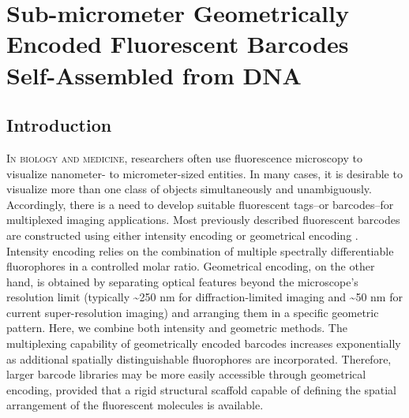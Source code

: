 
\chapter{Sub-micrometer Geometrically Encoded Fluorescent Barcodes Self-Assembled from DNA}\label{chapter:DNAbarcode}

\section{Introduction}
\lettrine{I}{n biology and medicine}, researchers often use fluorescence microscopy to visualize nanometer- to micrometer-sized entities. In many cases, it is desirable to visualize more than one class of objects simultaneously and unambiguously. Accordingly, there is a need to develop suitable 
fluorescent tags--or barcodes--for multiplexed imaging applications. Most previously 
described fluorescent barcodes are constructed using either intensity encoding \citep{han_quantum-dot-tagged_2001,xu_multiplexed_2003,li_multiplexed_2005,livet_transgenic_2007,fournier-bidoz_facile_2008,lin_self-assembled_2007,marcon_--fly_2010} or 
geometrical encoding \citep{nicewarner-pena_submicrometer_2001,gudiksen_growth_2002,braeckmans_encoding_2003,dejneka_rare_2003,geiss_direct_2008,pregibon_multifunctional_2007,xiao_direct_2009,li_controlled_2010}. Intensity encoding relies on the combination of multiple 
spectrally differentiable fluorophores in a controlled molar ratio. Geometrical encoding, 
on the other hand, is obtained by separating optical features beyond the microscope’s 
resolution limit (typically \textasciitilde250 nm for diffraction-limited imaging and \textasciitilde 50 nm for 
current super-resolution imaging) and arranging them in a specific geometric pattern.
Here, we combine both intensity and geometric methods. The multiplexing capability of geometrically encoded barcodes increases 
exponentially as additional spatially distinguishable fluorophores are incorporated. 
Therefore, larger barcode libraries may be more easily accessible through geometrical 
encoding, provided that a rigid structural scaffold capable of defining the spatial 
arrangement of the fluorescent molecules is available. 

